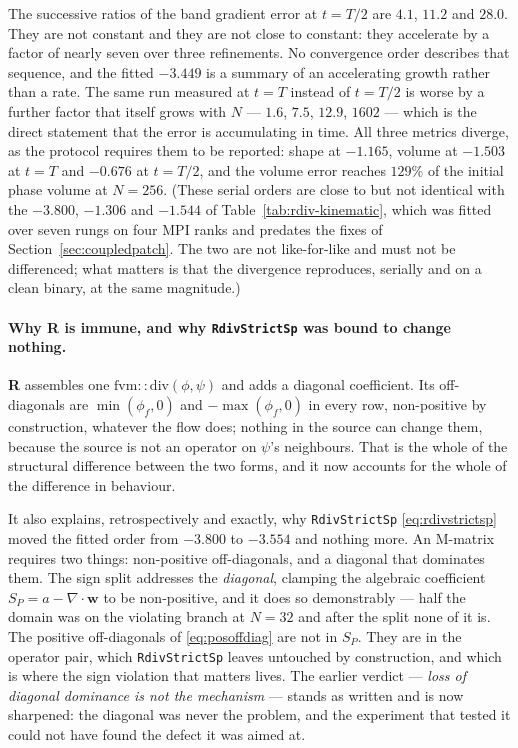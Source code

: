 \documentclass[preprint,3p,11pt]{elsarticle}
\newcommand{\psilev}{\psi}
\begin{document}
The successive ratios of the band gradient error at $t=T/2$ are $4.1$, $11.2$ and
$28.0$. They are not constant and they are not close to constant: they accelerate
by a factor of nearly seven over three refinements. No convergence order describes
that sequence, and the fitted $-3.449$ is a summary of an accelerating growth
rather than a rate. The same run measured at $t=T$ instead of $t=T/2$ is worse by
a further factor that itself grows with $N$ --- $1.6$, $7.5$, $12.9$, $1602$ ---
which is the direct statement that the error is accumulating in time. All three
metrics diverge, as the protocol requires them to be reported: shape at $-1.165$,
volume at $-1.503$ at $t=T$ and $-0.676$ at $t=T/2$, and the volume error reaches
$129\%$ of the initial phase volume at $N=256$. (These serial orders are close to
but not identical with the $-3.800$, $-1.306$ and $-1.544$ of
Table~\ref{tab:rdiv-kinematic}, which was fitted over seven rungs on four MPI
ranks and predates the fixes of Section~\ref{sec:coupledpatch}. The two are not
like-for-like and must not be differenced; what matters is that the divergence
reproduces, serially and on a clean binary, at the same magnitude.)

\paragraph{Why \textbf{R} is immune, and why \texttt{RdivStrictSp} was bound to
change nothing.} \textbf{R} assembles one $\mathrm{fvm::div}(\phi,\psilev)$ and
adds a diagonal coefficient. Its off-diagonals are $\min(\phi_f,0)$ and
$-\max(\phi_f,0)$ in every row, non-positive by construction, whatever the flow
does; nothing in the source can change them, because the source is not an
operator on $\psilev$'s neighbours. That is the whole of the structural difference
between the two forms, and it now accounts for the whole of the difference in
behaviour.

It also explains, retrospectively and exactly, why \texttt{RdivStrictSp}
\eqref{eq:rdivstrictsp} moved the fitted order from $-3.800$ to $-3.554$ and
nothing more. An M-matrix requires two things: non-positive off-diagonals, and a
diagonal that dominates them. The sign split addresses the \emph{diagonal},
clamping the algebraic coefficient $S_P = a - \nabla\cdot\mathbf{w}$ to be
non-positive, and it does so demonstrably --- half the domain was on the violating
branch at $N=32$ and after the split none of it is. The positive off-diagonals of
\eqref{eq:posoffdiag} are not in $S_P$. They are in the operator pair, which
\texttt{RdivStrictSp} leaves untouched by construction, and which is where the
sign violation that matters lives. The earlier verdict --- \emph{loss of diagonal
dominance is not the mechanism} --- stands as written and is now sharpened: the
diagonal was never the problem, and the experiment that tested it could not have
found the defect it was aimed at.
\end{document}
